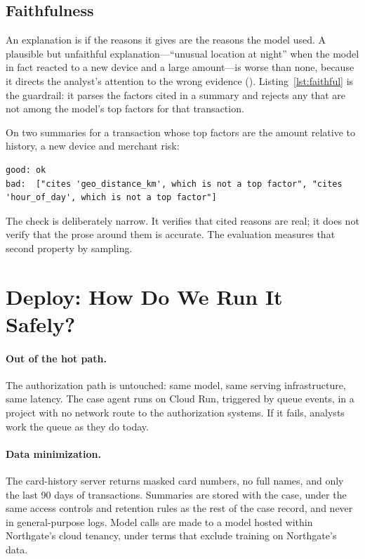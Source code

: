 \subsection{Faithfulness}

An explanation is  if the reasons it gives are the reasons the model used. A plausible but unfaithful explanation---``unusual location at night'' when the model in fact reacted to a new device and a large amount---is worse than none, because it directs the analyst's attention to the wrong evidence (). Listing~\ref{lst:faithful} is the guardrail: it parses the factors cited in a summary and rejects any that are not among the model's top factors for that transaction.



On two summaries for a transaction whose top factors are the amount relative to history, a new device and merchant risk:
\begin{lstlisting}[language={}, numbers=none, frame=none, xleftmargin=1.5em]
good: ok
bad:  ["cites 'geo_distance_km', which is not a top factor", "cites 'hour_of_day', which is not a top factor"]
\end{lstlisting}

The check is deliberately narrow. It verifies that cited reasons are real; it does not verify that the prose around them is accurate. The evaluation measures that second property by sampling.

\section{Deploy: How Do We Run It Safely?}
\label{sec:fr-deploy}

\paragraph{Out of the hot path.} The authorization path is untouched: same model, same serving infrastructure, same latency. The case agent runs on Cloud Run, triggered by queue events, in a project with no network route to the authorization systems. If it fails, analysts work the queue as they do today.

\paragraph{Data minimization.} The card-history server returns masked card numbers, no full names, and only the last 90 days of transactions. Summaries are stored with the case, under the same access controls and retention rules as the rest of the case record, and never in general-purpose logs. Model calls are made to a model hosted within Northgate's cloud tenancy, under terms that exclude training on Northgate's data.

